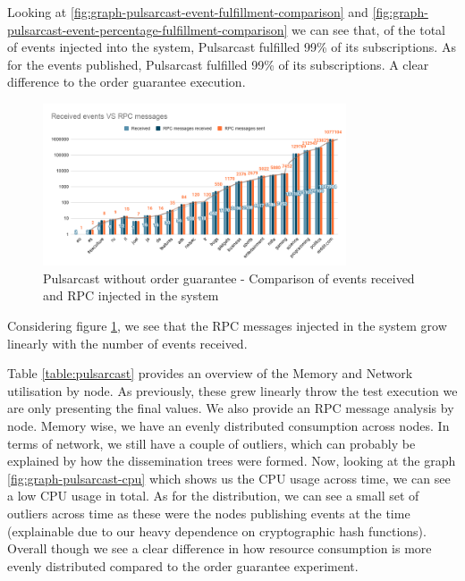 Looking at \ref{fig:graph-pulsarcast-event-fulfillment-comparison} and
\ref{fig:graph-pulsarcast-event-percentage-fulfillment-comparison} we can see
that, of the total of events injected into the system, Pulsarcast fulfilled
99\% of its subscriptions. As for the events published, Pulsarcast fulfilled
99\% of its subscriptions. A clear difference to the order guarantee execution.

\begin{figure}[!htb]
  \centering
  \includegraphics[width=0.8\textwidth]{img/graph-pulsarcast-rpc.png}
  \caption{Pulsarcast without order guarantee - Comparison of events received and RPC injected in the system}
  \label{fig:graph-pulsarcast-rpc}
\end{figure}

Considering figure \ref{fig:graph-pulsarcast-rpc}, we see that the RPC messages
injected in the system grow linearly with the number of events received.

Table \ref{table:pulsarcast} provides an overview of the Memory and Network
utilisation by node. As previously, these grew linearly throw the test
execution we are only presenting the final values. We also provide an RPC
message analysis by node. Memory wise, we have an evenly distributed
consumption across nodes. In terms of network, we still have a couple of
outliers, which can probably be explained by how the dissemination trees were
formed.  Now, looking at the graph \ref{fig:graph-pulsarcast-cpu} which shows
us the CPU usage across time, we can see a low CPU usage in total. As for the
distribution, we can see a small set of outliers across time as these were the
nodes publishing events at the time (explainable due to our heavy dependence on
cryptographic hash functions).  Overall though we see a clear difference in how
resource consumption is more evenly distributed compared to the order guarantee
experiment.

